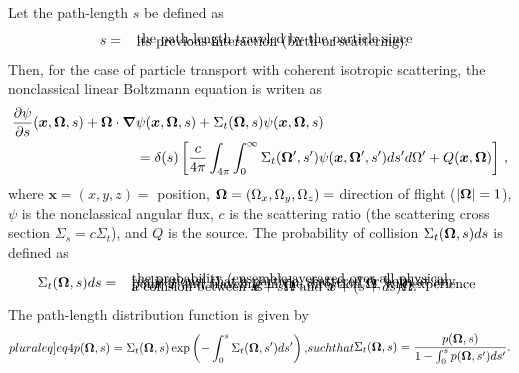 \documentclass[12pt]{article}
\newcommand{\ux}{{\bm x}}
\newcommand{\uomega}{{\bf \Omega}}
\begin{document}
Let the path-length $s$ be defined as
\begin{align}\label{eq1}
s =  \begin{array}{l}
\text{ the path-length traveled by the particle since}\vspace{-10pt}\\
\text{ its previous interaction (birth or scattering).}\\
\end{array}
\end{align}
Then, for the case of particle transport with coherent isotropic scattering, the nonclassical linear Boltzmann equation is writen as \citep{vaslar14a}
\begin{align}\label{eq2}
\frac{\partial\psi}{\partial s}(\ux,\uomega,s) + \uomega\cdot\bm\nabla & \psi(\ux,\uomega,s) + \Sigma_t(\uomega,s)\psi(\ux,\uomega,s) 
\\&= \delta(s)\left[ \frac{c}{4\pi}\int_{4\pi}\int_0^\infty \Sigma_t(\uomega',s')\psi(\ux,\uomega',s')ds' d\Omega' + Q(\ux,\uomega) \right]\,, \nonumber
\end{align}
where $\ux = (x,y,z)=$ position, $\uomega = (\Omega_x,\Omega_y,\Omega_z)=$ direction of flight ($|\uomega|=1$), $\psi$ is the nonclassical angular flux, $c$ is the scattering ratio (the scattering cross section $\Sigma_s= c\Sigma_t$), and $Q$ is the source.
The probability of collision $\Sigma_t(\uomega,s)ds$ is defined as
\begin{align}\label{eq3}
\Sigma_t(\uomega,s)ds =  \begin{array}{l}
\text{ the probability (ensemble-averaged over all physical}\vspace{-10pt}\\
\text{ realizations) that a particle, scattered or born at any}\vspace{-10pt}\\
\text{ point $\ux$ and traveling in the direction $\uomega$, will experience}\vspace{-10pt}\\
\text{ a collision between $\ux + s\uomega$ and $\ux + (s+ds)\uomega$.}
\end{array}
\end{align}
The path-length distribution function is given by
\begin{subequations}\label[pluraleq]{eq4}
\begin{align}\label{eq4a}
p(\uomega,s) = \Sigma_t(\uomega,s)\exp\left( -\int_0^s\Sigma_t(\uomega,s')ds'\right),
\end{align}
such that
\begin{align}\label{eq4b}
\Sigma_t(\uomega,s)=\frac{p(\uomega,s)}{1-\int_0^sp(\uomega,s')ds'}.
\end{align}
\end{subequations}
\end{document}
